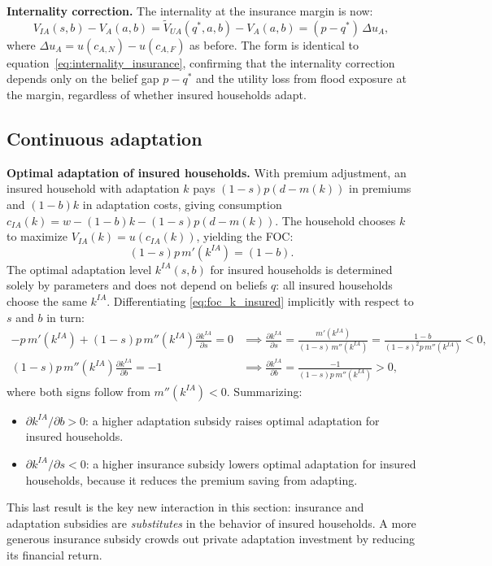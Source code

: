 \documentclass{article}
\begin{document}
\textbf{Internality correction.} The internality at the insurance margin is now:
\begin{equation}
    V_{IA}(s,b) - V_A(a,b) = \tilde{V}_{UA}(q^*,a,b) - V_A(a,b) = (p-q^*)\,\Delta u_A, \label{eq:internality_premium_disc}
\end{equation}
where $\Delta u_A = u(c_{A,N})-u(c_{A,F})$ as before. The form is identical to equation~\eqref{eq:internality_insurance}, confirming that the internality correction depends only on the belief gap $p-q^*$ and the utility loss from flood exposure at the margin, regardless of whether insured households adapt.

\subsection{Continuous adaptation}

\textbf{Optimal adaptation of insured households.} With premium adjustment, an insured household with adaptation $k$ pays $(1-s)p(d-m(k))$ in premiums and $(1-b)k$ in adaptation costs, giving consumption $c_{IA}(k) = w - (1-b)k - (1-s)p(d-m(k))$. The household chooses $k$ to maximize $V_{IA}(k) = u(c_{IA}(k))$, yielding the FOC:
\begin{equation}
    (1-s)p\,m'(k^{IA}) = (1-b). \label{eq:foc_k_insured}
\end{equation}
The optimal adaptation level $k^{IA}(s,b)$ for insured households is determined solely by parameters and does not depend on beliefs $q$: all insured households choose the same $k^{IA}$. Differentiating \eqref{eq:foc_k_insured} implicitly with respect to $s$ and $b$ in turn:
\begin{align}
    -p\,m'(k^{IA}) + (1-s)p\,m''(k^{IA})\frac{\partial k^{IA}}{\partial s} = 0
    &\implies
    \frac{\partial k^{IA}}{\partial s} = \frac{m'(k^{IA})}{(1-s)\,m''(k^{IA})} = \frac{1-b}{(1-s)^2 p\,m''(k^{IA})} < 0, \label{eq:dkIA_ds}\\[6pt]
    (1-s)p\,m''(k^{IA})\frac{\partial k^{IA}}{\partial b} = -1
    &\implies
    \frac{\partial k^{IA}}{\partial b} = \frac{-1}{(1-s)p\,m''(k^{IA})} > 0, \label{eq:dkIA_db}
\end{align}
where both signs follow from $m''(k^{IA}) < 0$. Summarizing:
\begin{itemize}
    \item $\partial k^{IA}/\partial b > 0$: a higher adaptation subsidy raises optimal adaptation for insured households.
    \item $\partial k^{IA}/\partial s < 0$: a higher insurance subsidy lowers optimal adaptation for insured households, because it reduces the premium saving from adapting.
\end{itemize}
This last result is the key new interaction in this section: insurance and adaptation subsidies are \emph{substitutes} in the behavior of insured households. A more generous insurance subsidy crowds out private adaptation investment by reducing its financial return.
\end{document}

